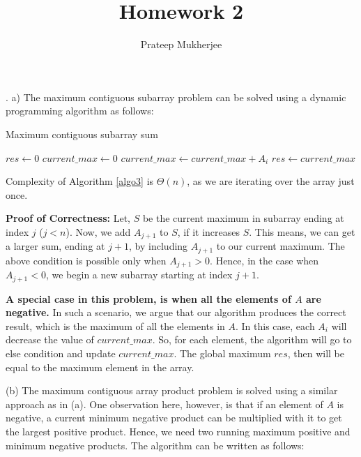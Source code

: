 \documentclass[assign]{article}
\title{Homework 2}
\author{Prateep Mukherjee}
\begin{document}
\maketitle

. a)  The maximum contiguous subarray problem can be solved using a dynamic programming algorithm as follows:

\begin{algorithm}[!hbt]
  \caption{Maximum contiguous subarray sum}
  $res \gets 0$\; 
  $current\_max \gets 0$\;
    {
         {
              $current\_max \gets current\_max + A_i$\;
        }  
         {
             $res \gets current\_max$\;
         }        
   }
\label{algo3}
\end{algorithm}

Complexity of Algorithm \ref{algo3} is $\Theta(n)$, as we are iterating over the array just once. 

\textbf{Proof of Correctness:}  Let, $S$ be the current maximum in subarray ending at index $j$ ($j < n$). Now, we add $A_{j+1}$ to $S$, if it increases $S$. This means, we can get a larger sum, ending at $j+1$, by including $A_{j+1}$ to our current maximum. 
The above condition is possible only when $A_{j+1} > 0$. Hence, in the case when $A_{j+1} < 0$, we begin a new subarray starting at index $j+1$. 

\textbf {A special case in this problem, is when all the elements of $A$ are negative.} In such a scenario, we argue that our algorithm produces the correct result, which is the maximum of all the elements in $A$. In this case, each $A_i$ will decrease the value of $current\_max$. So, for each element, the algorithm will go to else condition and update $current\_max$. The global maximum $res$, then will be equal to the maximum element in the array.

\noindent (b) The maximum contiguous array product problem is solved using a similar approach as in (a). One observation here, however, is that if an element of $A$ is negative, a current minimum negative product can be multiplied with it to get the largest positive product. Hence, we need two running maximum positive and minimum negative products. The algorithm can be written as follows:
\end{document}
